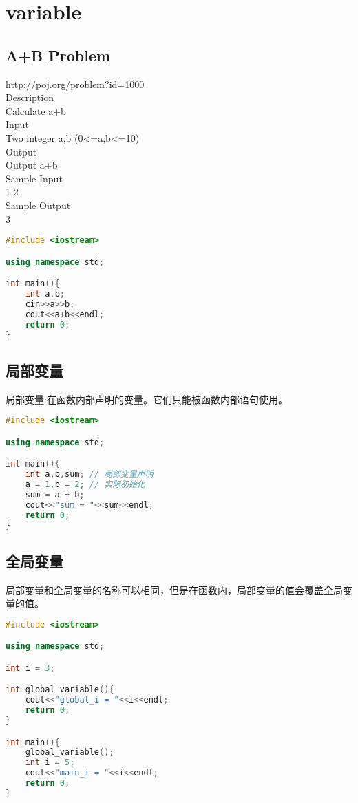 \documentclass[12pt,twiside,a4paper]{ctexbook}
\numberwithin{chapter}{part}
\begin{document}
\chapter{variable}
\section{A+B Problem}
http://poj.org/problem?id=1000\\
Description\\
Calculate a+b\\
Input\\
Two integer a,b (0<=a,b<=10)\\
Output\\
Output a+b\\
Sample Input\\
1 2\\
Sample Output\\
3
\begin{lstlisting}[language=C++]
#include <iostream>

using namespace std;

int main(){
	int a,b;
	cin>>a>>b;
	cout<<a+b<<endl;
	return 0;
}
\end{lstlisting}
\section{局部变量}
局部变量:在函数内部声明的变量。它们只能被函数内部语句使用。
\begin{lstlisting}[language=C++]
#include <iostream>

using namespace std;

int main(){
	int a,b,sum; // 局部变量声明
	a = 1,b = 2; // 实际初始化
	sum = a + b;
	cout<<"sum = "<<sum<<endl;
	return 0;
}
\end{lstlisting}

\section{全局变量}
局部变量和全局变量的名称可以相同，但是在函数内，局部变量的值会覆盖全局变量的值。
\begin{lstlisting}[language=C++]
#include <iostream>

using namespace std;

int i = 3;

int global_variable(){
	cout<<"global_i = "<<i<<endl;
	return 0;
}

int main(){
	global_variable();
	int i = 5;
	cout<<"main_i = "<<i<<endl;
	return 0;
}
\end{lstlisting}
\end{document}

